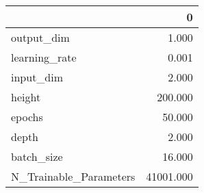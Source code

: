 \begin{tabular}{lr}
\toprule
{} &          0 \\
\midrule
output\_dim             &      1.000 \\
learning\_rate          &      0.001 \\
input\_dim              &      2.000 \\
height                 &    200.000 \\
epochs                 &     50.000 \\
depth                  &      2.000 \\
batch\_size             &     16.000 \\
N\_Trainable\_Parameters &  41001.000 \\
\bottomrule
\end{tabular}
